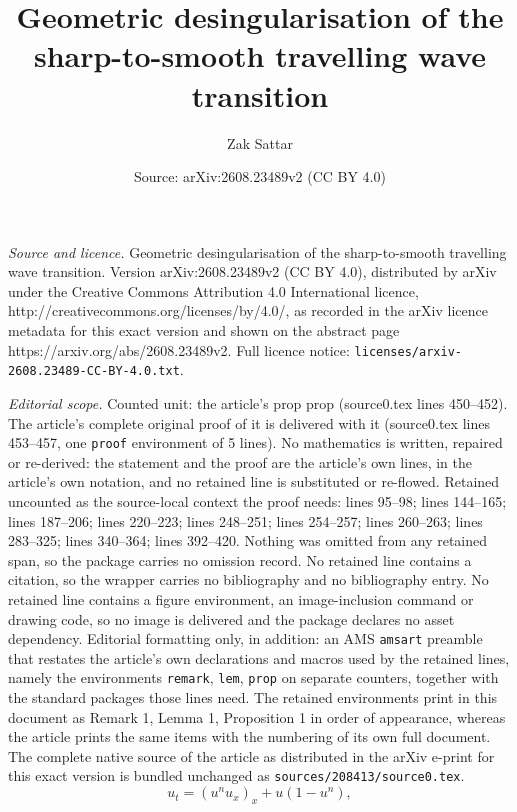 \documentclass[10pt,a4paper]{amsart}
\title{Geometric desingularisation of the sharp-to-smooth travelling wave transition}
\author{Zak Sattar}
\date{Source: arXiv:2608.23489v2 (CC BY 4.0)}
\begin{document}
\maketitle

\noindent\emph{Source and licence.} Geometric desingularisation of the sharp-to-smooth travelling wave transition. Version arXiv:2608.23489v2 (CC BY 4.0), distributed by arXiv under the Creative Commons Attribution 4.0 International licence, http://creativecommons.org/licenses/by/4.0/, as recorded in the arXiv licence metadata for this exact version and shown on the abstract page https://arxiv.org/abs/2608.23489v2. Full licence notice: \texttt{licenses/arxiv-2608.23489-CC-BY-4.0.txt}.\par\smallskip

\noindent\textit{Editorial scope.} Counted unit: the article's prop prop (source0.tex lines 450--452). The article's complete original proof of it is delivered with it (source0.tex lines 453--457, one \texttt{proof} environment of 5 lines). No mathematics is written, repaired or re-derived: the statement and the proof are the article's own lines, in the article's own notation, and no retained line is substituted or re-flowed.  Retained uncounted as the source-local context the proof needs: lines 95--98; lines 144--165; lines 187--206; lines 220--223; lines 248--251; lines 254--257; lines 260--263; lines 283--325; lines 340--364; lines 392--420.  Nothing was omitted from any retained span, so the package carries no omission record.  No retained line contains a citation, so the wrapper carries no bibliography and no bibliography entry.  No retained line contains a figure environment, an image-inclusion command or drawing code, so no image is delivered and the package declares no asset dependency.  Editorial formatting only, in addition: an AMS \texttt{amsart} preamble that restates the article's own declarations and macros used by the retained lines, namely the environments \texttt{remark}, \texttt{lem}, \texttt{prop} on separate counters, together with the standard packages those lines need.  The retained environments print in this document as Remark 1, Lemma 1, Proposition 1 in order of appearance, whereas the article prints the same items with the numbering of its own full document.  The complete native source of the article as distributed in the arXiv e-print for this exact version is bundled unchanged as \texttt{sources/208413/source0.tex}.
\begin{equation}
    u_t=(u^n u_x)_x+u(1-u^n),
    \label{pde1}
\end{equation}
\end{document}
